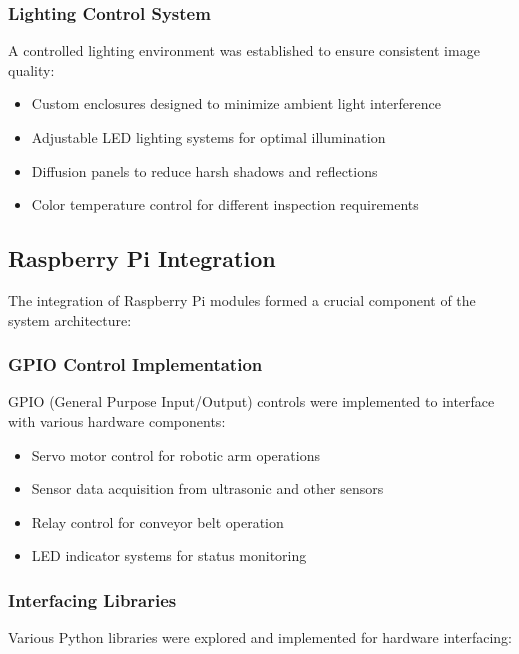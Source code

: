 \documentclass{book}
\begin{document}
\subsubsection{Lighting Control System}
\par\noindent A controlled lighting environment was established to ensure consistent image quality:

\begin{itemize}
\item Custom enclosures designed to minimize ambient light interference
\item Adjustable LED lighting systems for optimal illumination
\item Diffusion panels to reduce harsh shadows and reflections
\item Color temperature control for different inspection requirements
\end{itemize}

\subsection{Raspberry Pi Integration}
\par\noindent The integration of Raspberry Pi modules formed a crucial component of the system architecture:

\subsubsection{GPIO Control Implementation}
\par\noindent GPIO (General Purpose Input/Output) controls were implemented to interface with various hardware components:

\begin{itemize}
\item Servo motor control for robotic arm operations
\item Sensor data acquisition from ultrasonic and other sensors
\item Relay control for conveyor belt operation
\item LED indicator systems for status monitoring
\end{itemize}

\subsubsection{Interfacing Libraries}
\par\noindent Various Python libraries were explored and implemented for hardware interfacing:
\end{document}
